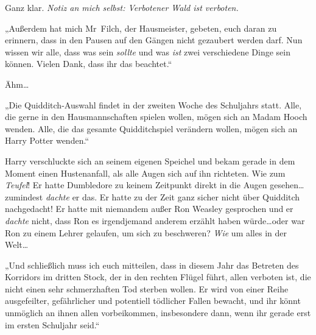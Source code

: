 Ganz klar. \emph{Notiz an mich selbst: Verbotener Wald ist verboten.}

„Außerdem hat mich Mr~Filch, der Hausmeister, gebeten, euch daran zu erinnern, dass in den Pausen auf den Gängen nicht gezaubert werden darf. Nun wissen wir alle, dass was sein \emph{sollte} und was \emph{ist} zwei verschiedene Dinge sein können. Vielen Dank, dass ihr das beachtet.“


Ähm…

„Die Quidditch-Auswahl findet in der zweiten Woche des Schuljahrs statt. Alle, die gerne in den Hausmannschaften spielen wollen, mögen sich an Madam Hooch wenden. Alle, die das gesamte Quidditchspiel verändern wollen, mögen sich an Harry Potter wenden.“

Harry verschluckte sich an seinem eigenen Speichel und bekam gerade in dem Moment einen Hustenanfall, als alle Augen sich auf ihn richteten. Wie zum \emph{Teufel}! Er hatte Dumbledore zu keinem Zeitpunkt direkt in die Augen gesehen…zumindest \emph{dachte} er das. Er hatte zu der Zeit ganz sicher nicht über Quidditch nachgedacht! Er hatte mit niemandem außer Ron Weasley gesprochen und er \emph{dachte} nicht, dass Ron es irgendjemand anderem erzählt haben würde…oder war Ron zu einem Lehrer gelaufen, um sich zu beschweren? \emph{Wie} um alles in der Welt…

„Und schließlich muss ich euch mitteilen, dass in diesem Jahr das Betreten des Korridors im dritten Stock, der in den rechten Flügel führt, allen verboten ist, die nicht einen sehr schmerzhaften Tod sterben wollen. Er wird von einer Reihe ausgefeilter, gefährlicher und potentiell tödlicher Fallen bewacht, und ihr könnt unmöglich an ihnen allen vorbeikommen, insbesondere dann, wenn ihr gerade erst im ersten Schuljahr seid.“

